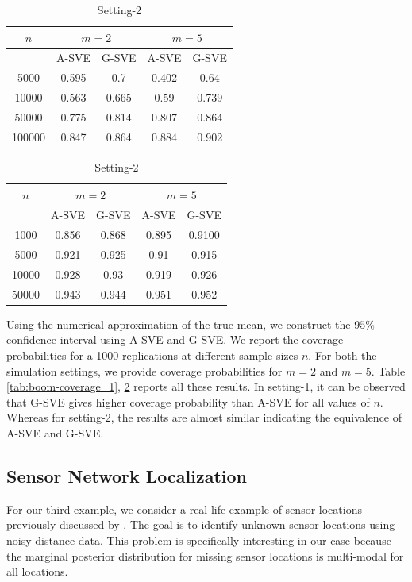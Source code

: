 \documentclass[11pt]{article}
\theoremstyle{remark}
\begin{document}
\begin{table}[h]
\parbox{.45\linewidth}{
\centering
\begin{tabular}{|c|c|c|c|c|}
\hline
 $n$ & \multicolumn{2}{|c|}{$m = 2$} & \multicolumn{2}{|c|}{$m=5$}\\
 \hline
 & A-SVE & G-SVE & A-SVE & G-SVE \\
 \hline
 5000 & 0.595 &  0.7 & 0.402 &  0.64\\
 10000 & 0.563 &  0.665 & 0.59 &  0.739\\
 50000 & 0.775 &  0.814 & 0.807 &  0.864\\
 100000 & 0.847 &  0.864 & 0.884 &  0.902\\
\hline
\end{tabular}
\caption{Setting-1}
\label{tab:boom-coverage_1}
}
\hfill
\parbox{.45\linewidth}{
\centering
\begin{tabular}{|c|c|c|c|c|}
 \hline
 $n$ & \multicolumn{2}{|c|}{$m = 2$} & \multicolumn{2}{|c|}{$m=5$}\\
 \hline
 & A-SVE & G-SVE & A-SVE & G-SVE \\
 \hline
 1000 &  0.856 &  0.868 & 0.895 &  0.9100\\
 5000 & 0.921 &  0.925 & 0.91 &  0.915\\
 10000 & 0.928 &  0.93 & 0.919 &  0.926\\
 50000 & 0.943 &  0.944 & 0.951 &  0.952\\
\hline
\end{tabular}
\caption{Setting-2}
\label{tab:boom-coverage_2}
}
\end{table}

Using the numerical approximation of the true mean, we construct the $95\%$ confidence interval using A-SVE and G-SVE. We report the coverage probabilities for a 1000 replications at different sample sizes $n$. For both the simulation settings, we provide coverage probabilities for $m=2$ and $m=5$. Table \ref{tab:boom-coverage_1}, \ref{tab:boom-coverage_2} reports all these results. In setting-1, it can be observed that G-SVE gives higher coverage probability than A-SVE for all values of $n$. Whereas for setting-2, the results are almost similar indicating the equivalence of A-SVE and G-SVE.



\subsection{Sensor Network Localization}

For our third example, we consider a real-life example of sensor locations previously discussed by \cite{ihler2005nonparametric}. The goal is to identify unknown sensor locations using noisy distance data. This problem is specifically interesting in our case because the marginal posterior distribution for missing sensor locations is multi-modal for all locations. 
\end{document}
